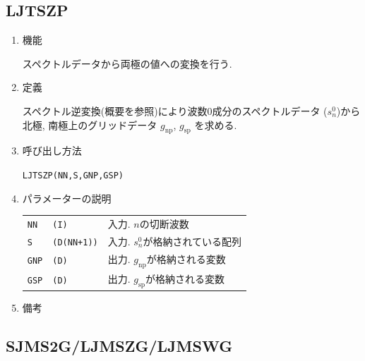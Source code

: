 \documentclass[a4j]{jarticle}
\begin{document}

\subsection{LJTSZP}

\begin{enumerate}

\item 機能 

スペクトルデータから両極の値への変換を行う.

\item 定義

スペクトル逆変換(概要を参照)により波数0成分のスペクトルデータ
($s^0_n$)から北極, 南極上のグリッドデータ $g_{\mbox{np}}$,
$g_{\mbox{sp}}$ を求める.

\item 呼び出し方法 

{\tt LJTSZP(NN,S,GNP,GSP)}
  
\item パラメーターの説明

\begin{tabular}{lll}
{\tt NN} & {\tt (I)} & 入力. $n$の切断波数\\
{\tt S} & {\tt (D(NN+1))} & 入力. $s^0_n$が格納されている配列\\
{\tt GNP} & {\tt (D)} & 出力. $g_{\mbox{np}}$が格納される変数\\
{\tt GSP} & {\tt (D)} & 出力. $g_{\mbox{sp}}$が格納される変数
\end{tabular}

\item 備考

\end{enumerate}


\subsection{SJMS2G/LJMSZG/LJMSWG}
\end{document}
